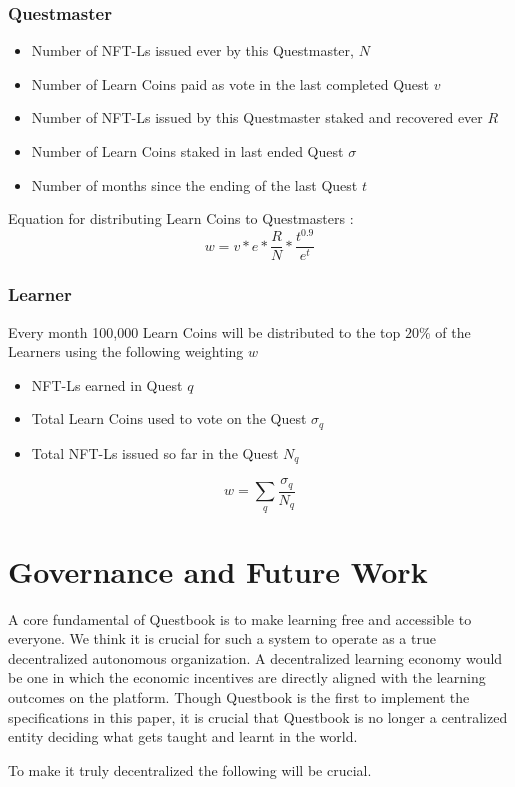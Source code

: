\documentclass{article}
\begin{document}
      \subsubsection{Questmaster}
        \begin{itemize}
          \item Number of NFT-Ls issued ever by this Questmaster, \(N\)
          \item Number of Learn Coins paid as vote in the last completed Quest \(v\)
          \item Number of NFT-Ls issued by this Questmaster staked and recovered ever \(R\)
          \item Number of Learn Coins staked in last ended Quest \(\sigma\)
          \item Number of months since the ending of the last Quest \(t\)
        \end{itemize}
        Equation for distributing Learn Coins to Questmasters :
        \[
          w =  v * e * \frac{R}{N} * \frac{t^{0.9}}{e^{t}}
        \]

      \subsubsection{Learner }  
        Every month 100,000 Learn Coins will be distributed to the top \(20\%\) of the Learners using the following weighting \(w\) 
        \begin{itemize}
          \item NFT-Ls earned in Quest \(q\)
          \item Total Learn Coins used to vote on the Quest \(\sigma_q\)
          \item Total NFT-Ls issued so far in the Quest \(N_q\)
        \end{itemize}
        \[
          w = \sum_{q} \frac{\sigma_q}{N_q}
        \]
  \section{Governance and Future Work}
    A core fundamental of Questbook is to make learning free and accessible to everyone. 
    We think it is crucial for such a system to operate as a true decentralized autonomous organization. 
    A decentralized learning economy would be one in which the economic incentives are directly aligned with the learning outcomes on the platform.
    Though Questbook is the first to implement the specifications in this paper, it is crucial that Questbook is no longer a centralized entity deciding what gets taught and learnt in the world.
    \par
    To make it truly decentralized the following will be crucial.
\end{document}
